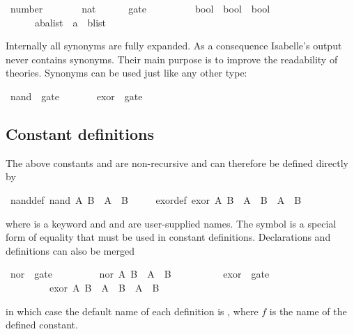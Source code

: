 \begin{isabelle}%
\ number\ \ \ \ \ \ \ {\isacharequal}\ nat\isanewline
\ \ \ \ \ \ gate\ \ \ \ \ \ \ \ \ {\isacharequal}\ {\isachardoublequote}bool\ {\isasymRightarrow}\ bool\ {\isasymRightarrow}\ bool{\isachardoublequote}\isanewline
\ \ \ \ \ \ {\isacharparenleft}{\isacharprime}a{\isacharcomma}{\isacharprime}b{\isacharparenright}alist\ {\isacharequal}\ {\isachardoublequote}{\isacharparenleft}{\isacharprime}a\ {\isacharasterisk}\ {\isacharprime}b{\isacharparenright}list{\isachardoublequote}%
\begin{isamarkuptext}%
\noindent{}%
Internally all synonyms are fully expanded.  As a consequence Isabelle's
output never contains synonyms.  Their main purpose is to improve the
readability of theories.  Synonyms can be used just like any other
type:%
\end{isamarkuptext}%
\ nand\ {\isacharcolon}{\isacharcolon}\ gate\isanewline
\ \ \ \ \ \ \ exor\ {\isacharcolon}{\isacharcolon}\ gate%
\begin{isamarkuptext}%
\subsection{Constant definitions}
\label{sec:ConstDefinitions}

The above constants  and  are non-recursive and can
therefore be defined directly by%
\end{isamarkuptext}%
\ nand{\isacharunderscore}def{\isacharcolon}\ {\isachardoublequote}nand\ A\ B\ {\isasymequiv}\ {\isasymnot}{\isacharparenleft}A\ {\isasymand}\ B{\isacharparenright}{\isachardoublequote}\isanewline
\ \ \ \ \ exor{\isacharunderscore}def{\isacharcolon}\ {\isachardoublequote}exor\ A\ B\ {\isasymequiv}\ A\ {\isasymand}\ {\isasymnot}B\ {\isasymor}\ {\isasymnot}A\ {\isasymand}\ B{\isachardoublequote}%
\begin{isamarkuptext}%
\noindent%
where  is a keyword and  and
 are user-supplied names.
The symbol  is a special form of equality
that must be used in constant definitions.
Declarations and definitions can also be merged%
\end{isamarkuptext}%
\ nor\ {\isacharcolon}{\isacharcolon}\ gate\isanewline
\ \ \ \ \ \ \ \ \ {\isachardoublequote}nor\ A\ B\ {\isasymequiv}\ {\isasymnot}{\isacharparenleft}A\ {\isasymor}\ B{\isacharparenright}{\isachardoublequote}\isanewline
\ \ \ \ \ \ \ \ \ \ exor\ {\isacharcolon}{\isacharcolon}\ gate\isanewline
\ \ \ \ \ \ \ \ \ {\isachardoublequote}exor\ A\ B\ {\isasymequiv}\ {\isacharparenleft}A\ {\isasymor}\ B{\isacharparenright}\ {\isasymand}\ {\isacharparenleft}{\isasymnot}A\ {\isasymor}\ {\isasymnot}B{\isacharparenright}{\isachardoublequote}%
\begin{isamarkuptext}%
\noindent{}%
in which case the default name of each definition is , where
$f$ is the name of the defined constant.%
\end{isamarkuptext}%
\end{isabelle}%

